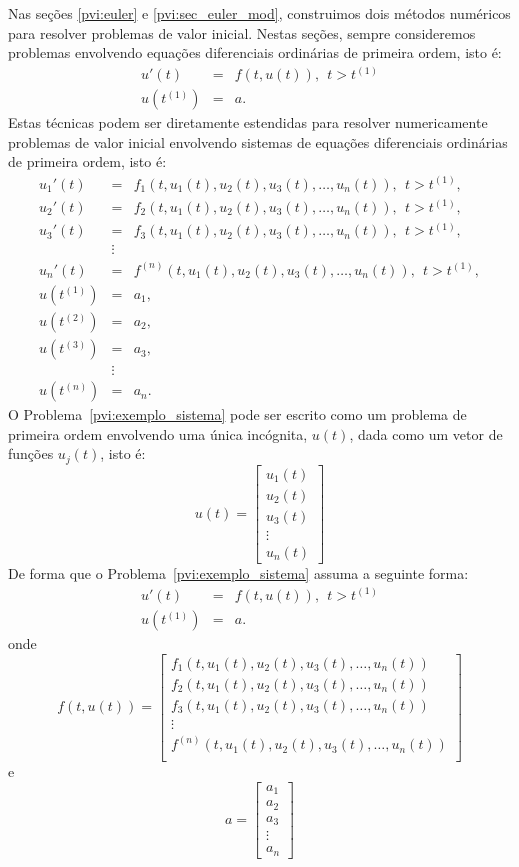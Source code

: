 Nas seções \ref{pvi:euler} e \ref{pvi:sec_euler_mod}, construimos dois métodos numéricos para resolver problemas de valor inicial. Nestas seções, sempre consideremos problemas envolvendo equações diferenciais ordinárias de primeira ordem, isto é:
\begin{eqnarray*}
  u'(t)  &=& f(t,u(t)),~~t>t^{(1)} \\
  u(t^{(1)}) &=& a.
\end{eqnarray*}
Estas técnicas podem ser diretamente estendidas para resolver numericamente problemas de valor inicial envolvendo sistemas de equações diferenciais ordinárias de primeira ordem, isto é:
\begin{eqnarray}\label{pvi:exemplo_sistema}
  u_1'(t)  &=& f_1(t,u_1(t), u_2(t), u_3(t),\ldots, u_n(t)),~~t>t^{(1)} ,\\
  u_2'(t)  &=& f_2(t,u_1(t), u_2(t), u_3(t),\ldots, u_n(t)),~~t>t^{(1)} ,\\
  u_3'(t)  &=& f_3(t,u_1(t), u_2(t), u_3(t),\ldots, u_n(t)),~~t>t^{(1)} ,\\
           &\vdots &\\
  u_n'(t)  &=& f^{(n)}(t,u_1(t), u_2(t), u_3(t),\ldots, u_n(t)),~~t>t^{(1)} ,\\
  u(t^{(1)}) &=& a_1 ,\\
  u(t^{(2)}) &=& a_2 ,\\
  u(t^{(3)}) &=& a_3 ,\\
  &\vdots&\\
  u(t^{(n)}) &=& a_n.
\end{eqnarray}
O Problema~\eqref{pvi:exemplo_sistema} pode ser escrito como um problema de primeira ordem envolvendo uma única incógnita, $u(t)$, dada como um vetor de funções $u_j(t)$, isto é:
$$u(t)=\left[
\begin{array}{c}
 u_1(t)\\
 u_2(t)\\
 u_3(t)\\
 \vdots\\
 u_n(t)
\end{array}
\right]$$
De forma que o Problema~\eqref{pvi:exemplo_sistema} assuma a seguinte forma:
\begin{eqnarray*}
  u'(t)  &=& f(t,u(t)),~~t>t^{(1)} \\
  u(t^{(1)}) &=& a.
\end{eqnarray*}
onde
$$f(t,u(t))=\left[
\begin{array}{c}
  f_1(t,u_1(t), u_2(t), u_3(t),\ldots, u_n(t))\\
  f_2(t,u_1(t), u_2(t), u_3(t),\ldots, u_n(t))\\
  f_3(t,u_1(t), u_2(t), u_3(t),\ldots, u_n(t))\\  
  \vdots\\
  f^{(n)}(t,u_1(t), u_2(t), u_3(t),\ldots, u_n(t))\\
  \end{array}
\right]$$
e
$$a=\left[
\begin{array}{c}
 a_1\\
 a_2\\
 a_3\\
 \vdots\\
 a_n
\end{array}
\right]$$

